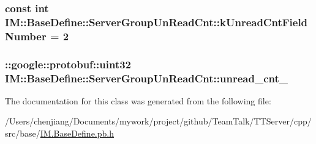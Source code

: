\subsubsection[{k\+Unread\+Cnt\+Field\+Number}]{\setlength{\rightskip}{0pt plus 5cm}const int I\+M\+::\+Base\+Define\+::\+Server\+Group\+Un\+Read\+Cnt\+::k\+Unread\+Cnt\+Field\+Number = 2\hspace{0.3cm}{\ttfamily [static]}}\label{class_i_m_1_1_base_define_1_1_server_group_un_read_cnt_ad0974713cc6a6349c3375b7ba01dc711}
\hypertarget{class_i_m_1_1_base_define_1_1_server_group_un_read_cnt_ab3b31a4f332f4819f601f72c4219ca9f}{}
\subsubsection[{unread\+\_\+cnt\+\_\+}]{\setlength{\rightskip}{0pt plus 5cm}\+::google\+::protobuf\+::uint32 I\+M\+::\+Base\+Define\+::\+Server\+Group\+Un\+Read\+Cnt\+::unread\+\_\+cnt\+\_\+\hspace{0.3cm}{\ttfamily [private]}}\label{class_i_m_1_1_base_define_1_1_server_group_un_read_cnt_ab3b31a4f332f4819f601f72c4219ca9f}


The documentation for this class was generated from the following file\+:\begin{DoxyCompactItemize}
\item 
/\+Users/chenjiang/\+Documents/mywork/project/github/\+Team\+Talk/\+T\+T\+Server/cpp/src/base/\hyperlink{_i_m_8_base_define_8pb_8h}{I\+M.\+Base\+Define.\+pb.\+h}\end{DoxyCompactItemize}
